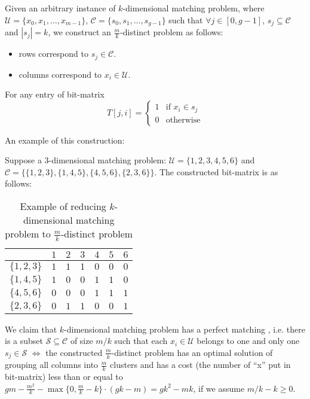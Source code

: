 \begin{IEEEproof}
Given an arbitrary instance of $k$-dimensional matching problem, where
$\mathcal{U} = \{x_0, x_1, \ldots, x_{m-1}\}$, $\mathcal{C} = \{s_0, s_1,
\ldots, s_{g-1}\}$ such that $\forall j \in [0, g-1]$, $s_j \subseteq
\mathcal{C}$ and $|s_j| = k$, we construct an $\frac{m}{k}$-distinct
problem as follows:

\begin{itemize}
\item rows correspond to $s_j \in \mathcal{C}$.
\item columns correspond to $x_i \in \mathcal{U}$.
\end{itemize}

For any entry of bit-matrix 
\begin{equation*}
T[j, i] = \left \{ \begin{array}{lr}
                   1 & \mbox{if $x_i \in s_j$} \\
                   0 & \mbox{otherwise}
                   \end{array} \right.
\end{equation*}

An example of this construction:

Suppose a $3$-dimensional matching problem: $\mathcal{U} = \{1, 2, 3,
4, 5, 6\}$ and $\mathcal{C} = \{\{1, 2, 3\}, \{1, 4, 5\}, \{4, 5, 6\},
\{2, 3, 6\}\}$. The constructed bit-matrix is as follows:

\begin{table}[!ht]
\centering
\begin{tabular}{|c|c|c|c|c|c|c|}
\hline 
              & $1$ & $2$ & $3$ & $4$ & $5$ & $6$ \\
\hline
$\{1, 2, 3\}$ & $1$ & $1$ & $1$ & $0$ & $0$ & $0$ \\
\hline
$\{1, 4, 5\}$ & $1$ & $0$ & $0$ & $1$ & $1$ & $0$ \\
\hline
$\{4, 5, 6\}$ & $0$ & $0$ & $0$ & $1$ & $1$ & $1$ \\
\hline
$\{2, 3, 6\}$ & $0$ & $1$ & $1$ & $0$ & $0$ & $1$ \\
\hline
\end{tabular}
\caption{Example of reducing $k$-dimensional matching problem 
to $\frac{m}{k}$-distinct problem}
\label{tab:egKRed}
\end{table}

We claim that $k$-dimensional matching problem has a perfect matching ,
i.e. there is a subset $\mathcal{S} \subseteq \mathcal{C}$ of size $m/k$
such that each $x_i \in \mathcal{U}$ belongs to one and only one $s_j
\in \mathcal{S}$ $\iff$ the constructed $\frac{m}{k}$-distinct problem
has an optimal solution of grouping all columns into $\frac{m}{k}$
clusters and has a cost (the number of ``x'' put in bit-matrix) less
than or equal to $g m - \frac{m^2}{k} - \max\{0, \frac{m}{k} - k\} \cdot
(g k - m) = gk^2 - mk$, if we assume $m/k - k \geq 0$.


\end{IEEEproof}
